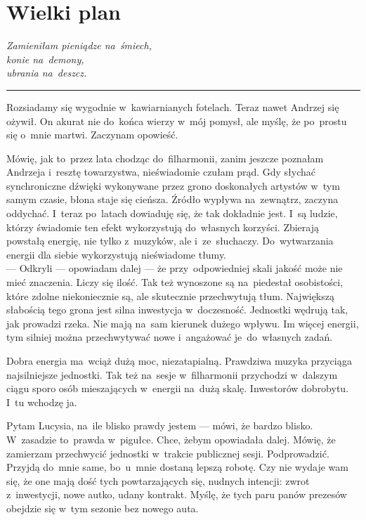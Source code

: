 \documentclass[9pt, a5paper]{memoir}
\begin{document}
\newpage
\section{Wielki plan}
{
\itshape
Zamieniłam pieniądze na~śmiech,\\
konie na~demony,\\
ubrania na~deszcz.
}

\fancybreak{* \quad * \quad *}

Rozsiadamy się wygodnie w~kawiarnianych fotelach. Teraz nawet Andrzej się ożywił. On akurat nie do~końca wierzy w~mój pomysł, ale myślę, że po~prostu się o~mnie martwi. Zaczynam opowieść.

Mówię, jak to~przez lata chodząc do~filharmonii, zanim jeszcze poznałam Andrzeja i~resztę towarzystwa, nieświadomie czułam prąd. Gdy słychać synchroniczne dźwięki wykonywane przez grono doskonałych artystów w~tym samym czasie, błona staje się cieńsza. Źródło wypływa na~zewnątrz, zaczyna oddychać. I~teraz po~latach dowiaduję się, że tak dokładnie jest. I~są ludzie, którzy świadomie ten efekt wykorzystują do~własnych korzyści. Zbierają powstałą energię, nie tylko z~muzyków, ale i~ze~słuchaczy. Do~wytwarzania energii dla siebie wykorzystują nieświadome tłumy.\\
--- Odkryli --- opowiadam dalej --- że przy~odpowiedniej skali jakość może nie mieć znaczenia. Liczy się ilość. Tak też wynoszone są na~piedestał osobistości, które zdolne niekoniecznie są, ale skutecznie przechwytują tłum. Największą słabością tego grona jest silna inwestycja w~doczesność. Jednostki wędrują tak, jak prowadzi rzeka. Nie mają na~sam kierunek dużego wpływu. Im więcej energii, tym silniej można przechwytywać nowe i~angażować je~do~własnych zadań.

Dobra energia ma~wciąż dużą moc, niezatapialną. Prawdziwa muzyka przyciąga najsilniejsze jednostki. Tak też na~sesje w~filharmonii przychodzi w~dalszym ciągu sporo osób mieszających w~energii na~dużą skalę. Inwestorów dobrobytu. I~tu wchodzę ja.

Pytam Lucysia, na~ile blisko prawdy jestem --- mówi, że bardzo blisko. W~zasadzie to~prawda w~pigułce. Chce, żebym opowiadała dalej. Mówię, że zamierzam przechwycić jednostki w~trakcie publicznej sesji. Podprowadzić. Przyjdą do~mnie same, bo~u~mnie dostaną lepszą robotę. Czy nie wydaje wam się, że one mają dość tych powtarzających się, nudnych intencji: zwrot z~inwestycji, nowe autko, udany kontrakt. Myślę, że tych paru panów prezesów obejdzie się w~tym sezonie bez nowego auta.
\end{document}
